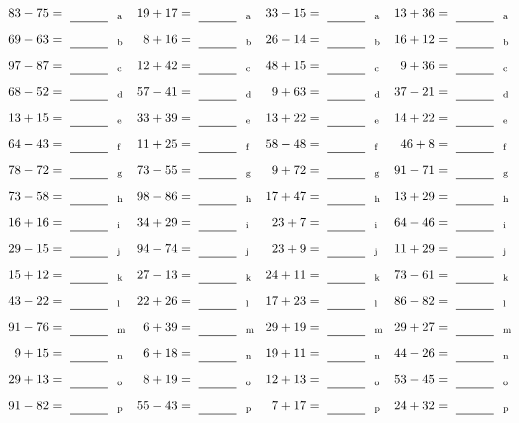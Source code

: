 \documentclass
[
  draft    = true,
  fontsize = 11pt,
  parskip  = half-
]
{scrartcl}
\begin{document}
\clearpage
\begin{align*}
    \pline{83-75}&=\rline{a}
  & \pline{19+17}&=\rline{a}
  & \pline{33-15}&=\rline{a}
  & \pline{13+36}&=\rline{a} \\[1ex]
    \pline{69-63}&=\rline{b}
  & \pline{8+16}&=\rline{b}
  & \pline{26-14}&=\rline{b}
  & \pline{16+12}&=\rline{b} \\[1ex]
    \pline{97-87}&=\rline{c}
  & \pline{12+42}&=\rline{c}
  & \pline{48+15}&=\rline{c}
  & \pline{9+36}&=\rline{c} \\[1ex]
    \pline{68-52}&=\rline{d}
  & \pline{57-41}&=\rline{d}
  & \pline{9+63}&=\rline{d}
  & \pline{37-21}&=\rline{d} \\[1ex]
    \pline{13+15}&=\rline{e}
  & \pline{33+39}&=\rline{e}
  & \pline{13+22}&=\rline{e}
  & \pline{14+22}&=\rline{e} \\[1ex]
    \pline{64-43}&=\rline{f}
  & \pline{11+25}&=\rline{f}
  & \pline{58-48}&=\rline{f}
  & \pline{46+8}&=\rline{f} \\[1ex]
    \pline{78-72}&=\rline{g}
  & \pline{73-55}&=\rline{g}
  & \pline{9+72}&=\rline{g}
  & \pline{91-71}&=\rline{g} \\[1ex]
    \pline{73-58}&=\rline{h}
  & \pline{98-86}&=\rline{h}
  & \pline{17+47}&=\rline{h}
  & \pline{13+29}&=\rline{h} \\[1ex]
    \pline{16+16}&=\rline{i}
  & \pline{34+29}&=\rline{i}
  & \pline{23+7}&=\rline{i}
  & \pline{64-46}&=\rline{i} \\[1ex]
    \pline{29-15}&=\rline{j}
  & \pline{94-74}&=\rline{j}
  & \pline{23+9}&=\rline{j}
  & \pline{11+29}&=\rline{j} \\[1ex]
    \pline{15+12}&=\rline{k}
  & \pline{27-13}&=\rline{k}
  & \pline{24+11}&=\rline{k}
  & \pline{73-61}&=\rline{k} \\[1ex]
    \pline{43-22}&=\rline{l}
  & \pline{22+26}&=\rline{l}
  & \pline{17+23}&=\rline{l}
  & \pline{86-82}&=\rline{l} \\[1ex]
    \pline{91-76}&=\rline{m}
  & \pline{6+39}&=\rline{m}
  & \pline{29+19}&=\rline{m}
  & \pline{29+27}&=\rline{m} \\[1ex]
    \pline{9+15}&=\rline{n}
  & \pline{6+18}&=\rline{n}
  & \pline{19+11}&=\rline{n}
  & \pline{44-26}&=\rline{n} \\[1ex]
    \pline{29+13}&=\rline{o}
  & \pline{8+19}&=\rline{o}
  & \pline{12+13}&=\rline{o}
  & \pline{53-45}&=\rline{o} \\[1ex]
    \pline{91-82}&=\rline{p}
  & \pline{55-43}&=\rline{p}
  & \pline{7+17}&=\rline{p}
  & \pline{24+32}&=\rline{p}
\end{align*}
\end{document}
